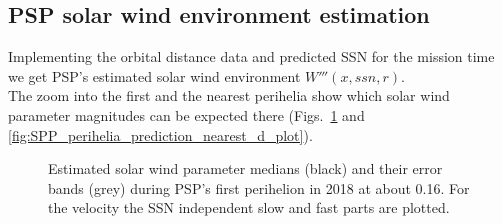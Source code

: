 \subsection{PSP solar wind environment estimation}
Implementing the orbital distance data and predicted SSN for the mission time we get PSP's estimated solar wind environment $W'''(x,ssn,r)$.\\
The zoom into the first and the nearest perihelia show which solar wind parameter magnitudes can be expected there (Figs.~\ref{fig:SPP_perihelia_prediction_d_plot} and \ref{fig:SPP_perihelia_prediction_nearest_d_plot}).\\
\begin{figure}
	\caption{Estimated solar wind parameter medians (black) and their error bands (grey) during PSP's first perihelion in 2018 at about \SI{0.16}{\au}. For the velocity the SSN independent slow and fast parts are plotted.}
	\label{fig:SPP_perihelia_prediction_d_plot}
\end{figure}
